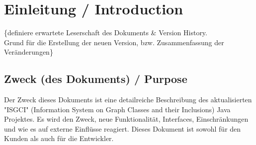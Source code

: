 \documentclass[11pt,a4paper]{article}
\begin{document}
%
%
%


\section{Einleitung / Introduction} %
	\{definiere erwartete Leserschaft des Dokuments \& Version History.\\
    Grund für die Erstellung der neuen Version, bzw. Zusammenfassung der Veränderungen\}



 	\subsection{Zweck (des Dokuments) / Purpose} %
	Der Zweck dieses Dokuments ist eine detailreiche Beschreibung des aktualisierten "ISGCI" (Information System on Graph Classes and their Inclusions) Java Projektes. Es wird den Zweck, neue Funktionalität, Interfaces, Einschränkungen und wie es auf externe Einflüsse reagiert. Dieses Dokument ist sowohl für den Kunden als auch für die Entwickler.
\end{document}
